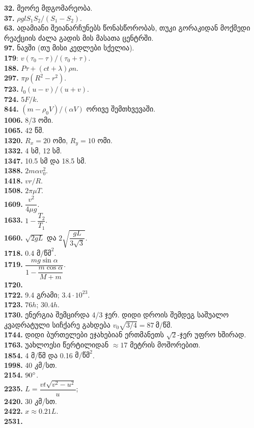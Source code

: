 \documentclass[12pt,a4paper,]{report}
\begin{document}
\textbf{32.} მეორე მდგომარეობა. \\
\textbf{37.} $\rho glS_1S_2/(S_1-S_2)$. \\
\textbf{63.} ადამიანი შეიანარჩუნებს წონასწორობას, თუკი გორაკიდან მოქმედი რეაქციის ძალა გადის მის მასათა ცენტრში. \\ 
\textbf{97.} ნავში (თუ მისი კედლები სქელია). \\
\textbf{179}: $v(\tau_0-\tau)/(\tau_0+\tau)$. \\
\textbf{188.} $P\tau+(ct+\lambda)\rho n$. \\
\textbf{297.} $\pi p(R^2-r^2)$. \\
\textbf{723.} $l_0(u-v)/(u+v)$. \\
\textbf{724.} $5F/k$. \\
\textbf{844.} $(m-\rho_0 V)/(\alpha V)$ ორივე შემთხვევაში.\\
\textbf{1006.} 8/3 ომი. \\
\textbf{1065.} 42 წმ. \\
\textbf{1320.} $R_x=20$ ომი, $R_y=10$ ომი.\\
\textbf{1332.} 4 სმ, 12 სმ. \\
\textbf{1347.} 10.5 სმ და 18.5 სმ. \\
\textbf{1388.} $2m\alpha v_0^2$. \\
\textbf{1418.} $vr/R$. \\
\textbf{1508.} $2\pi\mu T$. \\
\textbf{1609.} $\dfrac{v^2}{4\mu g}$. \\
\textbf{1633.} $1-\dfrac{T_2}{T_1}$. \\
\textbf{1660.} $\sqrt{2gL}$ და $2\sqrt{\dfrac{gL}{3\sqrt{3}}}$. \\
\textbf{1718.} 0.4 $\text{მ}/\text{წმ}^2$. \\
\textbf{1719.} $\dfrac{mg\sin\alpha}{1-\dfrac{m\cos\alpha}{M+m}}$. \\
\textbf{1720.} \\
\textbf{1722.} 9.4 გრამი; $3.4 \cdot 10^{23}$.\\
\textbf{1723.} $76h$; $30.4h$.\\
\textbf{1730.} ენერგია შემცირდა 4/3 ჯერ. დიდი დროის შემდეგ საშუალო კვადრატული სიჩქარე გახდება $v_0 \sqrt{3/4} = 87\ \text{მ/წმ}$. \\
\textbf{1744.} დიდი ბურთელები ეჯახებიან ერთმანეთს $\sqrt{2}$-ჯერ უფრო ხშირად. \\
\textbf{1763.} უახლოესი წერტილიდან $\approx 17$ მეტრის მოშორებით. \\
\textbf{1854.} 4 მ/წმ და 0.16 $\text{მ}/\text{წმ}^2$. \\
\textbf{1998.} 40 კმ/სთ. \\
\textbf{2154.} $90 \degree$. \\
\textbf{2235.} $L=\dfrac{vt\sqrt{v^2-u^2}}{u}$; \\
\textbf{2420.} 30 კმ/სთ. \\
\textbf{2422.} $x\approx0.21L$. \\
\textbf{2531.} 
\end{document}
